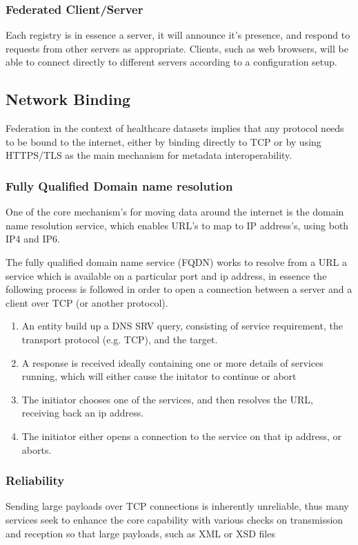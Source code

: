 \documentclass{article}
\begin{document}
		
		\subsubsection{Federated Client/Server}
		Each registry is in essence a server, it will announce it's presence, and respond to requests from other servers as appropriate. Clients, such as web browsers, will be able to connect directly to different servers according to a configuration setup.
		
		
		\subsection{Network Binding}
		Federation in the context of healthcare datasets implies that any protocol needs to be bound to the internet, either by binding directly to TCP or by using HTTPS/TLS as the main mechanism for metadata interoperability.
		
		\subsubsection{Fully Qualified Domain name resolution}
		One of the core mechanism's for moving data around the internet is the domain name resolution service, which enables URL's to map to IP address's, using both IP4 and IP6. 
		
		The fully qualified domain name service (FQDN) works to resolve from a URL a service which is available on a particular port and ip address, in essence the following process is followed in order to open a connection between a server and a client over TCP (or another protocol).
		\begin{enumerate}
			\item An entity build up a DNS SRV query, consisting of service requirement, the transport protocol (e.g. TCP), and the target.
			\item A response is received ideally containing one or more details of services running, which will either cause the initator to continue or abort
			\item The initiator chooses one of the services, and then resolves the URL, receiving back an ip address.
			\item The initiator either opens a connection to the service on that ip address, or aborts.
		\end{enumerate}
		
		\subsubsection{Reliability}
		Sending large payloads over TCP connections is inherently unreliable, thus many services seek to enhance the core capability with various checks on transmission and reception so that large payloads, such as XML or XSD files		
		
\end{document}
